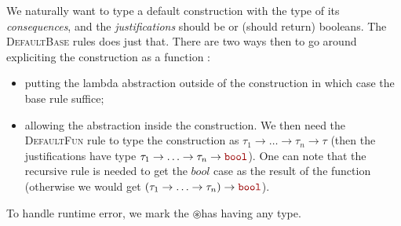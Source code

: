 \documentclass[11pt,a4paper]{article}
\newcommand{\synvar}[1]{\ensuremath{#1}}
\newcommand{\synkeyword}[1]{\textcolor{red!60!black}{\texttt{#1}}}
\newcommand{\synbool}{\synkeyword{bool}}
\newcommand{\synerror}{\synvar{\circledast}}
\begin{document}
We naturally want to type a default construction with the type of its \textit{consequences}, and the \textit{justifications} should be or (should return) booleans. The \textsc{DefaultBase} rules does just that. There are two ways then to go around expliciting the construction as a function :
\begin{itemize}
  \item putting the lambda abstraction outside of the construction in which case the base rule suffice;
  \item allowing the abstraction inside the construction. We then need the \textsc{DefaultFun} rule to type the construction as $\tau_1 \rightarrow \ldots \rightarrow \tau_n \rightarrow \tau$ (then the justifications have type $\tau_1\rightarrow\ldots\rightarrow\tau_n\rightarrow\synbool$). One can note that the recursive rule is needed to get the \synvar{bool} case as the result of the function (otherwise we would get $(\tau_1\rightarrow\ldots\rightarrow\tau_n)\rightarrow\synbool$).
\end{itemize}
To handle runtime error, we mark the \synerror\;has having any type.
\end{document}
